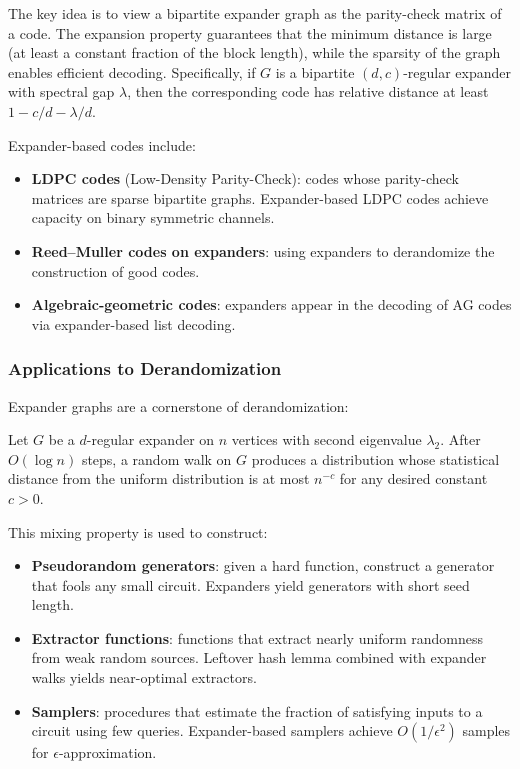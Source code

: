 The key idea is to view a bipartite expander graph as the parity-check matrix of a code. The expansion property guarantees that the minimum distance is large (at least a constant fraction of the block length), while the sparsity of the graph enables efficient decoding. Specifically, if $G$ is a bipartite $(d, c)$-regular expander with spectral gap $\lambda$, then the corresponding code has relative distance at least $1 - c/d - \lambda/d$.

Expander-based codes include:
\begin{itemize}
    \item \textbf{LDPC codes} (Low-Density Parity-Check): codes whose parity-check matrices are sparse bipartite graphs. Expander-based LDPC codes achieve capacity on binary symmetric channels.
    \item \textbf{Reed--Muller codes on expanders}: using expanders to derandomize the construction of good codes.
    \item \textbf{Algebraic-geometric codes}: expanders appear in the decoding of AG codes via expander-based list decoding.
\end{itemize}

\subsubsection*{Applications to Derandomization}

Expander graphs are a cornerstone of derandomization:

\begin{theorem}
Let $G$ be a $d$-regular expander on $n$ vertices with second eigenvalue $\lambda_2$. After $O(\log n)$ steps, a random walk on $G$ produces a distribution whose statistical distance from the uniform distribution is at most $n^{-c}$ for any desired constant $c > 0$.
\end{theorem}

This mixing property is used to construct:
\begin{itemize}
    \item \textbf{Pseudorandom generators}: given a hard function, construct a generator that fools any small circuit. Expanders yield generators with short seed length.
    \item \textbf{Extractor functions}: functions that extract nearly uniform randomness from weak random sources. Leftover hash lemma combined with expander walks yields near-optimal extractors.
    \item \textbf{Samplers}: procedures that estimate the fraction of satisfying inputs to a circuit using few queries. Expander-based samplers achieve $O(1/\epsilon^2)$ samples for $\epsilon$-approximation.
\end{itemize}

